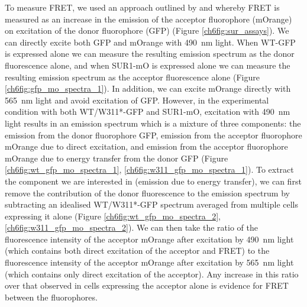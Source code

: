 To measure FRET, we used an approach outlined by \textcite{clegg_18_1992} and \textcite{selvin_13_1995} whereby FRET is measured as an increase in the emission of the acceptor fluorophore (mOrange) on excitation of the donor fluorophore (GFP) (Figure \ref{ch6fig:sur_assays}).
We can directly excite both GFP and mOrange with \SI{490}{\nano\metre} light.
When WT-GFP is expressed alone we can measure the resulting emission spectrum as the donor fluorescence alone, and when SUR1-mO is expressed alone we can measure the resulting emission spectrum as the acceptor fluorescence alone (Figure \ref{ch6fig:gfp_mo_spectra_1}).
In addition, we can excite mOrange directly with \SI{565}{\nano\metre} light and avoid excitation of GFP.
However, in the experimental condition with both WT/W311*-GFP and SUR1-mO, excitation with \SI{490}{\nano\metre} light results in an emission spectrum which is a mixture of three components: the emission from the donor fluorophore GFP, emission from the acceptor fluorophore mOrange due to direct excitation, and emission from the acceptor fluorophore mOrange due to energy transfer from the donor GFP (Figure \ref{ch6fig:wt_gfp_mo_spectra_1}, \ref{ch6fig:w311_gfp_mo_spectra_1}).
To extract the component we are interested in (emission due to energy transfer), we can first remove the contribution of the donor fluorescence to the emission spectrum by subtracting an idealised WT/W311*-GFP spectrum averaged from multiple cells expressing it alone (Figure \ref{ch6fig:wt_gfp_mo_spectra_2}, \ref{ch6fig:w311_gfp_mo_spectra_2}).
We can then take the ratio of the fluorescence intensity of the acceptor mOrange after excitation by \SI{490}{\nano\metre} light (which contains both direct excitation of the acceptor and FRET) to the fluorescence intensity of the acceptor mOrange after excitation by \SI{565}{\nano\metre} light (which contains only direct excitation of the acceptor).
Any increase in this ratio over that observed in cells expressing the acceptor alone is evidence for FRET between the fluorophores.

